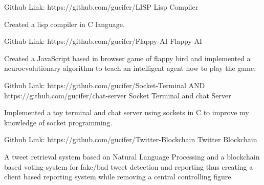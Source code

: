 \begin{cventries}
  \cventry
    {Github Link: https://github.com/gucifer/LISP} %
    {Lisp Compiler} %
    {} %
    {} %
    {
      \begin{cvitems} %
        \item {Created a lisp compiler in C language.}
      \end{cvitems}
    }
  \cventry
    {Github Link: https://github.com/gucifer/Flappy-AI} %
    {Flappy-AI} %
    {} %
    {} %
    {
      \begin{cvitems} %
        \item {Created a JavaScript based in browser game of flappy bird and implemented a neuroevolutionary algorithm to teach an intelligent agent how to play the game.}
      \end{cvitems}
    }
  \cventry
    {Github Link: https://github.com/gucifer/Socket-Terminal AND https://github.com/gucifer/chat-server} %
    {Socket Terminal and chat Server} %
    {} %
    {} %
    {
      \begin{cvitems} %
        \item {Implemented a toy terminal and chat server using sockets in C to improve my knowledge of socket programming.}
      \end{cvitems}
    }
  \cventry
    {Github Link: https://github.com/gucifer/Twitter-Blockchain} %
    {Twitter Blockchain} %
    {} %
    {} %
    {
      \begin{cvitems} %
        \item {A tweet retrieval system based on Natural Language Processing and a blockchain based voting system for fake/bad tweet detection and reporting thus creating a client based reporting system while removing a central controlling figure.}
      \end{cvitems}
    }
\end{cventries}
